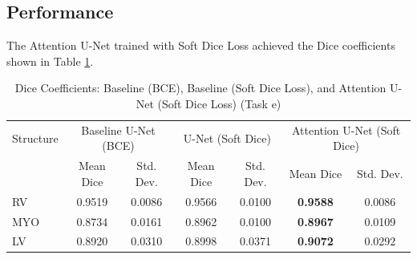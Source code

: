 \documentclass{article}
\begin{document}
\subsection{Performance}
The Attention U-Net trained with Soft Dice Loss achieved the Dice coefficients shown in Table \ref{tab:attention_unet_comparison}.
\begin{table}[H]
  \centering
  \caption{Dice Coefficients: Baseline (BCE), Baseline (Soft Dice Loss), and Attention U-Net (Soft Dice Loss) (Task e)}
  \label{tab:attention_unet_comparison}
  \begin{tabular}{l|cc|cc|cc}
    \toprule
    Structure & \multicolumn{2}{c|}{Baseline U-Net (BCE)} & \multicolumn{2}{c|}{U-Net (Soft Dice)} & \multicolumn{2}{c}{Attention U-Net (Soft Dice)}                                           \\
              & Mean Dice                                 & Std. Dev.                              & Mean Dice                                       & Std. Dev. & Mean Dice       & Std. Dev. \\
    \midrule
    RV        & 0.9519                                    & 0.0086                                 & 0.9566                                          & 0.0100    & \textbf{0.9588} & 0.0086    \\
    MYO       & 0.8734                                    & 0.0161                                 & 0.8962                                          & 0.0100    & \textbf{0.8967} & 0.0109    \\
    LV        & 0.8920                                    & 0.0310                                 & 0.8998                                          & 0.0371    & \textbf{0.9072} & 0.0292    \\
    \bottomrule
  \end{tabular}
\end{table}
\end{document}
